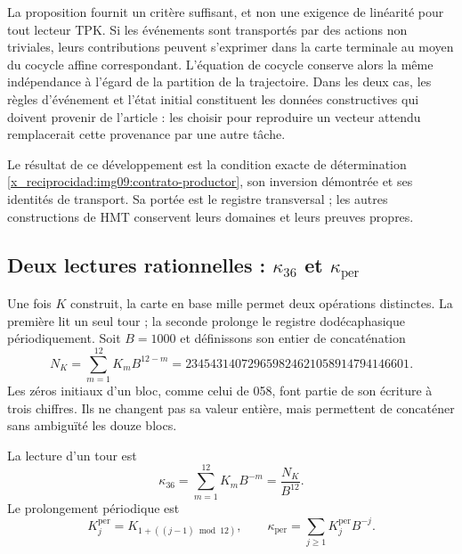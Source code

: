 La proposition fournit un critère suffisant, et non une exigence de
linéarité pour tout lecteur TPK. Si les événements sont transportés par des actions
non triviales, leurs contributions peuvent s’exprimer dans la carte terminale
au moyen du cocycle affine correspondant. L’équation de cocycle conserve
alors la même indépendance à l’égard de la partition de la trajectoire.
Dans les deux cas, les règles d’événement et l’état initial constituent les
données constructives qui doivent provenir de l’article : les choisir pour
reproduire un vecteur attendu remplacerait cette provenance par une autre tâche.

Le résultat de ce développement est la condition exacte de détermination
\eqref{x_reciprocidad:img09:contrato-productor}, son inversion démontrée et ses identités
de transport. Sa portée est le registre transversal ; les autres
constructions de HMT conservent leurs domaines et leurs preuves propres.



\subsection{Deux lectures rationnelles : \texorpdfstring{\(\kappa_{36}\)}{kappa36} et \texorpdfstring{\(\kappa_{\mathrm{per}}\)}{kappa périodique}}
\label{x_reciprocidad:subsec:k-kappas}

Une fois \(K\) construit, la carte en base mille permet deux opérations
distinctes. La première lit un seul tour ; la seconde prolonge le registre dodécaphasique
périodiquement. Soit \(B=1000\) et définissons son entier de concaténation
\begin{equation}
 N_K=\sum_{m=1}^{12}K_mB^{12-m}
 =234543140729659824621058914794146601.
 \label{x_reciprocidad:eq:k-numerador}
\end{equation}
Les zéros initiaux d'un bloc, comme celui de 058, font partie de son écriture
à trois chiffres. Ils ne changent pas sa valeur entière, mais permettent de concaténer
sans ambiguïté les douze blocs.

\begin{definition}
\label{x_reciprocidad:def:k-kappas}
La lecture d'un tour est
\[
 \kappa_{36}=\sum_{m=1}^{12}K_mB^{-m}=\frac{N_K}{B^{12}}.
\]
Le prolongement périodique est
\[
 K_j^{\mathrm{per}}=K_{1+((j-1)\bmod12)},\qquad
 \kappa_{\mathrm{per}}=\sum_{j\geq1}K_j^{\mathrm{per}}B^{-j}.
\]
\end{definition}

